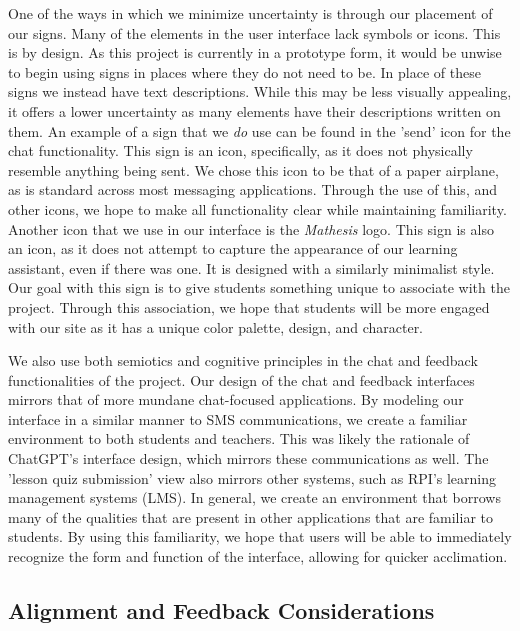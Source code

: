 \documentclass[12pt,a4paper]{article}
\begin{document}
    One of the ways in which we minimize uncertainty is through our placement of our signs.  Many
    of the elements in the user interface lack symbols or icons.  This is by design.  As this project
    is currently in a prototype form, it would be unwise to begin using signs in places where they do
    not need to be.  In place of these signs we instead have text descriptions.  While this may be
    less visually appealing, it offers a lower uncertainty as many elements have their descriptions
    written on them.  An example of a sign that we \textit{do} use can be found in the 'send' icon for the
    chat functionality.  This sign is an icon, specifically, as it does not physically resemble anything
    being sent.  We chose this icon to be that of a paper airplane, as is standard across most
    messaging applications.  Through the use of this, and other icons, we hope to make all functionality
    clear while maintaining familiarity.  Another icon that we use in our interface is the \textit{Mathesis}
    logo.  This sign is also an icon, as it does not attempt to capture the appearance of our learning
    assistant, even if there was one.  It is designed with a similarly minimalist style.  Our goal with
    this sign is to give students something unique to associate with the project.  Through this
    association, we hope that students will be more engaged with our site as it has a unique color
    palette, design, and character.

    We also use both semiotics and cognitive principles in the chat and feedback functionalities of
    the project.  Our design of the chat and feedback interfaces mirrors that of more mundane chat-focused
    applications.  By modeling our interface in a similar manner to SMS communications, we create a
    familiar environment to both students and teachers.  This was likely the rationale of ChatGPT's
    interface design, which mirrors these communications as well.  The 'lesson quiz submission' view also
    mirrors other systems, such as RPI's learning management systems (LMS).  In general, we create an
    environment that borrows many of the qualities that are present in other applications that are
    familiar to students. By using this familiarity, we hope that users will be able to immediately
    recognize the form and function of the interface, allowing for quicker acclimation.

    \subsection{Alignment and Feedback Considerations}
\end{document}
